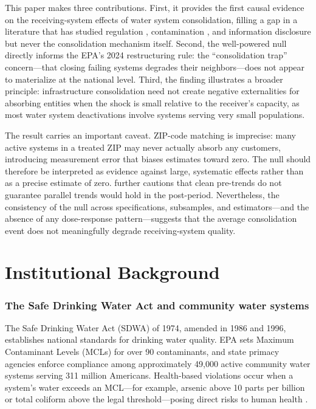 \documentclass[12pt]{article}
\begin{document}
This paper makes three contributions. First, it provides the first causal evidence on the receiving-system effects of water system consolidation, filling a gap in a literature that has studied regulation \citep{keiser2019consequences, cunningham2021safe}, contamination \citep{marcus2021going, graff2018drinking}, and information disclosure \citep{bennear2009impact} but never the consolidation mechanism itself. Second, the well-powered null directly informs the EPA's 2024 restructuring rule: the ``consolidation trap'' concern---that closing failing systems degrades their neighbors---does not appear to materialize at the national level. Third, the finding illustrates a broader principle: infrastructure consolidation need not create negative externalities for absorbing entities when the shock is small relative to the receiver's capacity, as most water system deactivations involve systems serving very small populations.

The result carries an important caveat. ZIP-code matching is imprecise: many active systems in a treated ZIP may never actually absorb any customers, introducing measurement error that biases estimates toward zero. The null should therefore be interpreted as evidence against large, systematic effects rather than as a precise estimate of zero. \citet{roth2023pretest} further cautions that clean pre-trends do not guarantee parallel trends would hold in the post-period. Nevertheless, the consistency of the null across specifications, subsamples, and estimators---and the absence of any dose-response pattern---suggests that the average consolidation event does not meaningfully degrade receiving-system quality.


\section{Institutional Background}

\subsubsection*{The Safe Drinking Water Act and community water systems} The Safe Drinking Water Act (SDWA) of 1974, amended in 1986 and 1996, establishes national standards for drinking water quality. EPA sets Maximum Contaminant Levels (MCLs) for over 90 contaminants, and state primacy agencies enforce compliance among approximately 49,000 active community water systems serving 311 million Americans. Health-based violations occur when a system's water exceeds an MCL---for example, arsenic above 10 parts per billion or total coliform above the legal threshold---posing direct risks to human health \citep{epa2023sdwis}.
\end{document}

